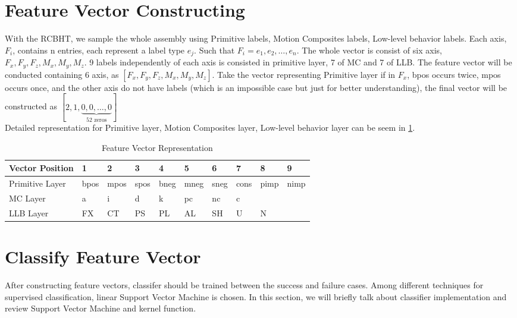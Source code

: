 \section{Feature Vector Constructing}
\indent With the RCBHT, we sample the whole assembly using Primitive labels, Motion Composites labels, Low-level behavior labels. Each axis, $F_{i}$, contains n entries, each represent a label type $e_{j}$. Such that $F_{i} = {e_{1}, e_{2}, \dots , e_{n}}$. The whole vector is consist of six axis, $F_{x}, F_{y}, F_{z}, M_{x}, M_{y}, M_{z}$. 9 labels independently of each axis is consisted in primitive layer, 7 of MC and 7 of LLB. The feature vector will be conducted containing 6 axis, as $[F_{x}, F_{y}, F_{z}, M_{x}, M_{y}, M_{z}]$. Take the vector representing Primitive layer if in $F_{x}$, bpos occurs twice, mpos occurs once, and the other axis do not have labels (which is an impossible case but just for better understanding), the final vector will be constructed as $[2, 1,\underbrace{0,0, \dots, 0}_\text{52 zeros}]$     \\
\indent Detailed representation for Primitive layer, Motion Composites layer, Low-level behavior layer can be seem in \ref{featureVector}.
\begin {table}[h]
\centering
\caption {Feature Vector Representation}
\label {featureVector}
\begin {tabular}{|llllllllll|}
\hline
Vector Position & 1     & 2     & 3     & 4     & 5     & 6     & 7     & 8     & 9     \\ \hline
Primitive Layer & bpos  & mpos  & spos  & bneg  & mneg  & sneg  & cons  & pimp  & nimp  \\ \hline
MC Layer        & a     & i     & d     & k     & pc    & nc    & c     &       &       \\ \hline
LLB Layer       & FX    & CT    & PS    & PL    & AL    & SH    & U     & N     &       \\ \hline
\end {tabular}
\end {table}
\section{Classify Feature Vector}
After constructing feature vectors, classifer should be trained between the success and failure cases. Among different techniques for supervised classification, linear Support Vector Machine is chosen. In this section, we will briefly talk about classifier implementation and review Support Vector Machine and kernel function.\\
